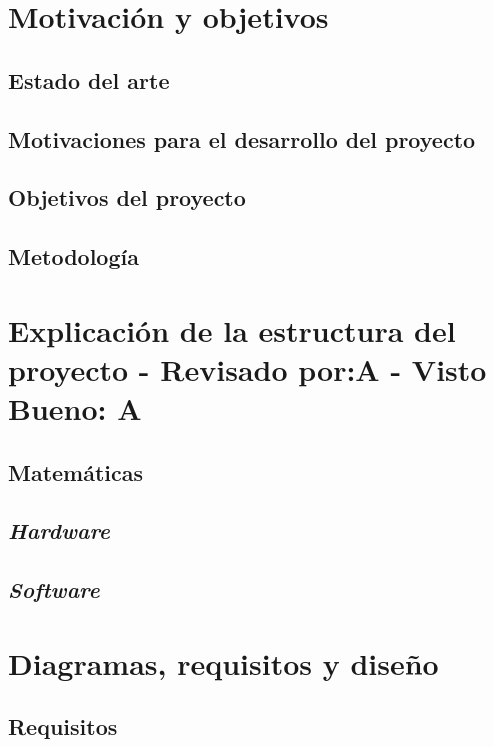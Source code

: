 \chapter{Motivación y objetivos}

\section{Estado del arte}

\section{Motivaciones para el desarrollo del proyecto}

\section{Objetivos del proyecto}

\section{Metodología}


\chapter{Explicación de la estructura del proyecto - Revisado por:A - Visto Bueno: A}

\section{Matemáticas}

\section{\textit{Hardware}}

\section{\textit{Software}}


\chapter{Diagramas, requisitos y diseño}

\section{Requisitos}

